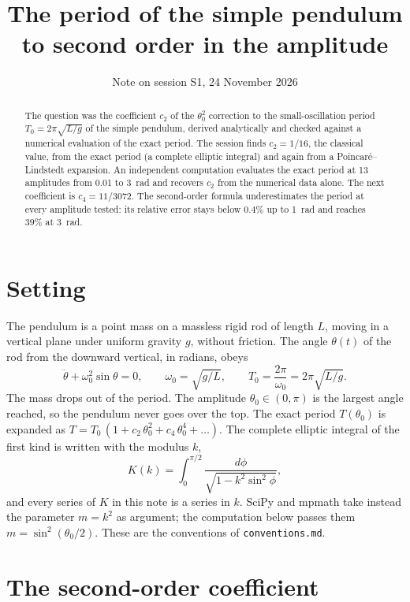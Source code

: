 \documentclass[11pt]{article}
\title{The period of the simple pendulum to second order in the amplitude}
\author{Note on session S1, 24 November 2026}
\date{}
\begin{document}
\maketitle

\begin{abstract}
The question was the coefficient $c_2$ of the $\theta_0^2$ correction to the
small-oscillation period $T_0 = 2\pi\sqrt{L/g}$ of the simple pendulum,
derived analytically and checked against a numerical evaluation of the exact
period. The session finds $c_2 = 1/16$, the classical value, from the exact
period (a complete elliptic integral) and again from a Poincar\'e--Lindstedt
expansion. An independent computation evaluates the exact period at 13
amplitudes from 0.01 to 3~rad and recovers $c_2$ from the numerical data
alone. The next coefficient is $c_4 = 11/3072$. The second-order formula
underestimates the period at every amplitude tested: its relative error stays
below $0.4\%$ up to 1~rad and reaches $39\%$ at 3~rad.
\end{abstract}

\section*{Setting}
The pendulum is a point mass on a massless rigid rod of length $L$, moving in
a vertical plane under uniform gravity $g$, without friction. The angle
$\theta(t)$ of the rod from the downward vertical, in radians, obeys
\begin{equation}
  \ddot\theta + \omega_0^2 \sin\theta = 0, \qquad
  \omega_0 = \sqrt{g/L}, \qquad T_0 = \frac{2\pi}{\omega_0} = 2\pi\sqrt{L/g}.
  \label{eq:eom}
\end{equation}
The mass drops out of the period. The amplitude $\theta_0 \in (0,\pi)$ is the
largest angle reached, so the pendulum never goes over the top. The exact period $T(\theta_0)$ is expanded as
$T = T_0\,(1 + c_2\,\theta_0^2 + c_4\,\theta_0^4 + \dots)$.
The complete elliptic integral of the first kind is written with the modulus
$k$,
\begin{equation}
  K(k) = \int_0^{\pi/2} \frac{d\phi}{\sqrt{1 - k^2\sin^2\phi}},
\end{equation}
and every series of $K$ in this note is a series in $k$. SciPy and mpmath take
instead the parameter $m = k^2$ as argument; the computation below passes them
$m = \sin^2(\theta_0/2)$. These are the conventions of \texttt{conventions.md}.

\section{The second-order coefficient}
\end{document}
